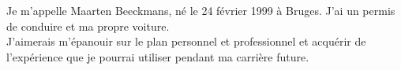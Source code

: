 \documentclass[9pt]{developercv} %
\begin{document}

\begin{minipage}[t]{0.4\textwidth} %
	\vspace{-\baselineskip} %
	
	Je m'appelle Maarten Beeckmans, né le 24 f\'{e}vrier 1999 à Bruges. J'ai un permis de conduire et ma propre voiture.\\ 
	J'aimerais m'\'{e}panouir sur le plan personnel et professionnel et acqu\'{e}rir de l'exp\'{e}rience que je pourrai utiliser pendant ma carri\`{e}re future.
\end{minipage}
\hfill %
\begin{minipage}[t]{0.5\textwidth} %
	\vspace{-\baselineskip} %
	\begin{barchart}{5.5}
	\end{barchart}
\end{minipage}


\end{document}

